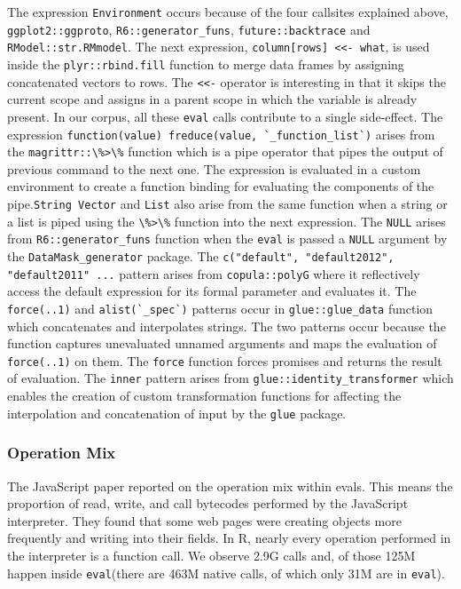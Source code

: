 \documentclass[USenglish,cleveref, autoref, thm-restate]{lipics-v2019}
\newcommand{\eval}{\texttt{eval}\xspace}
\newcommand{\evals}{{\sf eval}s\xspace}
\renewcommand{\c}[1]{\lstinline{#1}\xspace}
\begin{document}
The expression \c{Environment} occurs because of the four callsites
explained above, \c{ggplot2::ggproto}, \c{R6::generator_funs},
\c{future::backtrace} and \c{RModel::str.RMmodel}. The next expression,
\c{column[rows] <<- what}, is used inside the \c{plyr::rbind.fill} function
to merge data frames by assigning concatenated vectors to rows. The \c{<<-}
operator is interesting in that it skips the current scope and assigns in a
parent scope in which the variable is already present. In our corpus, all
these \eval calls contribute to a single side-effect. The expression
\c{function(value) freduce(value, `_function_list`)} arises from the
\c{magrittr::\%>\%} function which is a pipe operator that pipes the output
of previous command to the next one. The expression is evaluated in a custom
environment to create a function binding for evaluating the components of
the pipe.\c{String Vector} and \c{List} also arise from the same function
when a string or a list is piped using the \c{\%>\%} function into the next
expression.  The \c{NULL} arises from \c{R6::generator_funs} function when
the \eval is passed a \c{NULL} argument by the \c{DataMask_generator}
package. The \c{c("default", "default2012", "default2011" ...} pattern
arises from \c{copula::polyG} where it reflectively access the default
expression for its formal parameter and evaluates it. The \c{force(..1)} and
\c{alist(`_spec`)} patterns occur in \c{glue::glue_data} function which
concatenates and interpolates strings. The two patterns occur because the
function captures unevaluated unnamed arguments and maps the evaluation of
\c{force(..1)} on them.  The \c{force} function forces promises and returns
the result of evaluation. The \c{inner} pattern arises from
\c{glue::identity_transformer} which enables the creation of custom
transformation functions for affecting the interpolation and concatenation
of input by the \c{glue} package.


\subsubsection{Operation Mix}

The JavaScript paper reported on the operation mix within \evals. This means
the proportion of read, write, and call bytecodes performed by the
JavaScript interpreter. They found that some web pages were creating objects
more frequently and writing into their fields.  In R, nearly every operation
performed in the interpreter is a function call. We observe 2.9G calls and,
of those 125M happen inside \eval (there are 463M native calls, of which
only 31M are in \eval).
\end{document}

